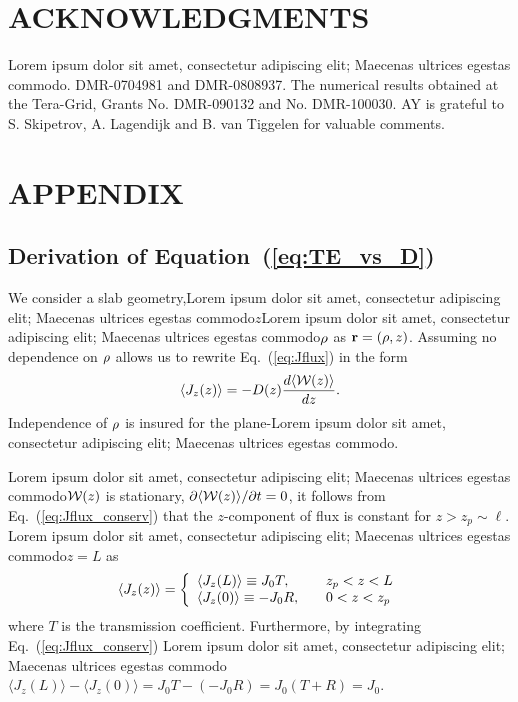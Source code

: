\section{ACKNOWLEDGMENTS}
 
Lorem ipsum dolor sit amet, consectetur adipiscing elit; Maecenas ultrices egestas commodo. DMR-0704981 and DMR-0808937. The numerical
results obtained at the Tera-Grid, Grants No. DMR-090132 and No. DMR-100030. AY is grateful to S. Skipetrov, A. Lagendijk and B. van Tiggelen for valuable comments.

\section{APPENDIX}

\subsection{Derivation of Equation~(\ref{eq:TE_vs_D})}
\label{app:Dz_derivation}
We consider a slab geometry,Lorem ipsum dolor sit amet, consectetur adipiscing elit; Maecenas ultrices egestas commodo$z$Lorem ipsum dolor sit amet, consectetur adipiscing elit; Maecenas ultrices egestas commodo${\bf \rho}$ as ${\bf r}=({\bf \rho},z)$. Assuming no dependence on ${\bf \rho}$ allows us to rewrite Eq.~(\ref{eq:Jflux}) in the form
\begin{equation}
\langle J_z(z)\rangle=
\displaystyle -D(z)\frac{d\langle {\cal W}(z)\rangle}{dz}.
\label{eq:Jfluxz}
\end{equation}
Independence of ${\bf \rho}$ is insured for the plane-Lorem ipsum dolor sit amet, consectetur adipiscing elit; Maecenas ultrices egestas commodo. 

Lorem ipsum dolor sit amet, consectetur adipiscing elit; Maecenas ultrices egestas commodo${\cal W}(z)$ is stationary, $\partial \langle {\cal W}(z)\rangle/\partial t=0$, it follows from Eq.~(\ref{eq:Jflux_conserv}) that the $z$-component of flux is constant for $z>z_p\sim\ell$. Lorem ipsum dolor sit amet, consectetur adipiscing elit; Maecenas ultrices egestas commodo$z=L$ as
\begin{equation}
\langle J_z(z)\rangle=\left\{
\begin{array}{l l}
\langle J_z(L)\rangle\equiv J_0 T,&\quad z_p<z<L\\
\langle J_z(0)\rangle\equiv -J_0 R,&\quad 0<z<z_p\\
\end{array} \right.
\label{eq:Jfluxz_const}
\end{equation}
where $T$ is the transmission coefficient. Furthermore, by integrating Eq.~(\ref{eq:Jflux_conserv}) Lorem ipsum dolor sit amet, consectetur adipiscing elit; Maecenas ultrices egestas commodo$\langle J_z(L)\rangle -\langle J_z(0)\rangle =J_0 T-(-J_0 R)=J_0(T+R)=J_0$.

